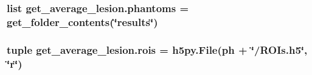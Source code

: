 \hypertarget{namespaceget__average__lesion_a18dd42d421835ddf04df21748b1fbd97}{
\subsubsection[{phantoms}]{\setlength{\rightskip}{0pt plus 5cm}list get\-\_\-average\-\_\-lesion.\-phantoms = {\bf get\-\_\-folder\-\_\-contents}(\char`\"{}results\char`\"{})}}\label{namespaceget__average__lesion_a18dd42d421835ddf04df21748b1fbd97}
\hypertarget{namespaceget__average__lesion_af4a292c67ad6c19a4faf0f86f5aa0f45}{
\subsubsection[{rois}]{\setlength{\rightskip}{0pt plus 5cm}tuple get\-\_\-average\-\_\-lesion.\-rois = h5py.\-File(ph + \char`\"{}/R\-O\-Is.\-h5\char`\"{}, \char`\"{}r\char`\"{})}}\label{namespaceget__average__lesion_af4a292c67ad6c19a4faf0f86f5aa0f45}
